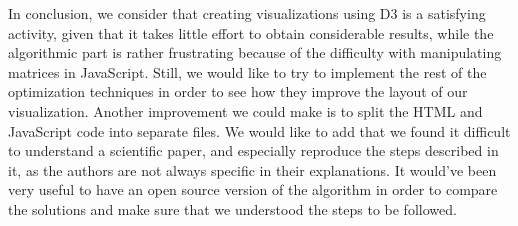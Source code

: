 \documentclass{report}
\begin{document}
In conclusion, we consider that creating visualizations using D3 is a satisfying activity, given that it takes little effort to obtain considerable results, while the algorithmic part is rather frustrating because of the difficulty with manipulating matrices in JavaScript. Still, we would like to try to implement the rest of the optimization techniques in order to see how they improve the layout of our visualization. Another improvement we could make is to split the HTML and JavaScript code into separate files. We would like to add that we found it difficult to understand a scientific paper, and especially reproduce the steps described in it, as the authors are not always specific in their explanations. It would've been very useful to have an open source version of the algorithm in order to compare the solutions and make sure that we understood the steps to be followed.

  

\end{document}
